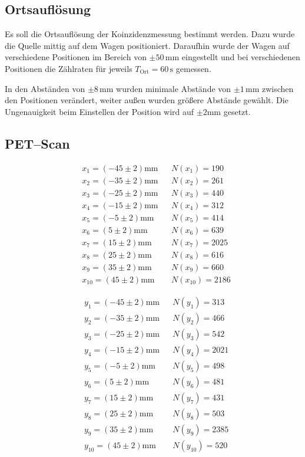 \documentclass[12pt,a4paper]{scrartcl}
\numberwithin{equation}{section} %
\newcommand{\pu}[1]{\ensuremath{\mathrm{#1}}}
\renewcommand{\[}{} %
\renewcommand{\]}{\noindent} %
\begin{document}
\hypertarget{ortsaufluxf6sung}{%
\subsection{Ortsauflösung}\label{ortsaufluxf6sung}}
Es soll die Ortsauflösung der Koinzidenzmessung bestimmt werden. Dazu wurde die Quelle mittig auf dem Wagen positioniert. Daraufhin wurde der Wagen auf verschiedene Positionen im Bereich von $\pm 50\,\mathrm{mm}$ eingestellt und bei verschiedenen Positionen die Zählraten für jeweils $T_\mathrm{Ort}=60\,\mathrm{s}$ gemessen.

In den Abständen von $\pm 8\,\mathrm{mm}$ wurden minimale Abstände von $\pm 1\,\mathrm{mm}$ zwischen den Positionen verändert, weiter außen wurden größere Abstände gewählt. Die Ungenauigkeit beim Einstellen der Position wird auf \(\pu{\pm 2 mm}\) gesetzt.

\hypertarget{petscan}{%
\subsection{PET--Scan}\label{petscan}}


\begin{align*}
    &x_1 = \pu{(-45\pm2) mm} &&
        N(x_1) = 190 \\
    &x_2 = \pu{(-35\pm2) mm} &&
        N(x_2) = 261 \\
    &x_3 = \pu{(-25\pm2) mm} &&
        N(x_3) = 440 \\
    &x_4 = \pu{(-15\pm2) mm} &&
        N(x_4) = 312 \\
    &x_5 = \pu{(-5\pm2) mm} &&
        N(x_5) = 414 \\
    &x_6 = \pu{(5\pm2) mm} &&
        N(x_6) = 639 \\
    &x_7 = \pu{(15\pm2) mm} &&
        N(x_7) = 2025 \\
    &x_8 = \pu{(25\pm2) mm} &&
        N(x_8) = 616 \\
    &x_9 = \pu{(35\pm2) mm} &&
        N(x_9) = 660 \\
    &x_{10} = \pu{(45\pm2) mm} &&
        N(x_{10}) = 2186
\end{align*}

\begin{align*}
    &y_1 = \pu{(-45\pm2) mm} &&
        N(y_1) = 313 \\
    &y_2 = \pu{(-35\pm2) mm} &&
        N(y_2) = 466 \\
    &y_3 = \pu{(-25\pm2) mm} &&
        N(y_3) = 542 \\
    &y_4 = \pu{(-15\pm2) mm} &&
        N(y_4) = 2021 \\
    &y_5 = \pu{(-5\pm2) mm} &&
        N(y_5) = 498 \\
    &y_6 = \pu{(5\pm2) mm} &&
        N(y_6) = 481 \\
    &y_7 = \pu{(15\pm2) mm} &&
        N(y_7) = 431 \\
    &y_8 = \pu{(25\pm2) mm} &&
        N(y_8) = 503 \\
    &y_9 = \pu{(35\pm2) mm} &&
        N(y_9) = 2385 \\
    &y_{10} = \pu{(45\pm2) mm} &&
        N(y_{10}) = 520
\end{align*}
\end{document}
